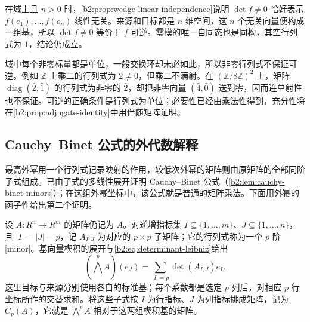 在域上且 \(n>0\) 时，\cref{b2:prop:wedge-linear-independence}说明 \(\det f\ne0\) 恰好表示 \(f(e_1),\ldots,f(e_n)\) 线性无关。来源和目标都是 \(n\) 维空间，这 \(n\) 个无关向量便构成一组基，所以 \(\det f\ne0\) 等价于 \(f\) 可逆。零模的唯一自同态也是同构，其空行列式为 \(1\)，结论仍成立。

\ProseParagraphBreak
域中每个非零标量都是单位，一般交换环却未必如此，所以非零行列式不保证可逆。例如 \(\mathbb Z\) 上乘二的行列式为 \(2\ne0\)，但乘二不满射。在 \((\mathbb Z/8\mathbb Z)^2\) 上，矩阵 \(\operatorname{diag}(\bar2,\bar1)\) 的行列式为非零的 \(\bar2\)，却把非零向量 \((\bar4,\bar0)\) 送到零，因而连单射性也不保证。可逆的正确条件是行列式为单位；必要性已经由乘法性得到，充分性将在\cref{b2:prop:adjugate-identity}中用伴随矩阵证明。

\subsection{Cauchy–Binet 公式的外代数解释}
\label{b2:subsec:0903:03}

最高外幂用一个行列式记录映射的作用，较低次外幂的矩阵则由原矩阵的全部同阶子式组成。已由子式的多线性展开证明 Cauchy–Binet 公式（\cref{b2:lem:cauchy-binet-minors}）；在这组外幂坐标中，该公式就是普通的矩阵乘法。下面用外幂的函子性给出第二个证明。

\ProseParagraphBreak
设 \(A:R^n\to R^m\) 的矩阵仍记为 \(A\)。对递增指标集 \(I\subseteq\{1,\ldots,m\}\)、\(J\subseteq\{1,\ldots,n\}\)，且 \(|I|=|J|=p\)，记 \(A_{I,J}\) 为对应的 \(p\times p\) 子矩阵；它的行列式称为一个 \(p\) 阶[minor]。基向量楔积的展开与\eqref{b2:eq:determinant-leibniz}给出
\begin{equation}\label{b2:eq:exterior-minor-action}
	\left(\bigwedge^p A\right)(e_J) =\sum_{|I|=p}\det(A_{I,J})e_I.
\end{equation}
这里目标与来源分别使用各自的标准基；每个系数都是选定 \(p\) 列后，对相应 \(p\) 行坐标所作的交替求和。将这些子式按 \(I\) 为行指标、\(J\) 为列指标排成矩阵，记为 \(C_p(A)\)，它就是 \(\bigwedge^p A\) 相对于这两组楔积基的矩阵。

